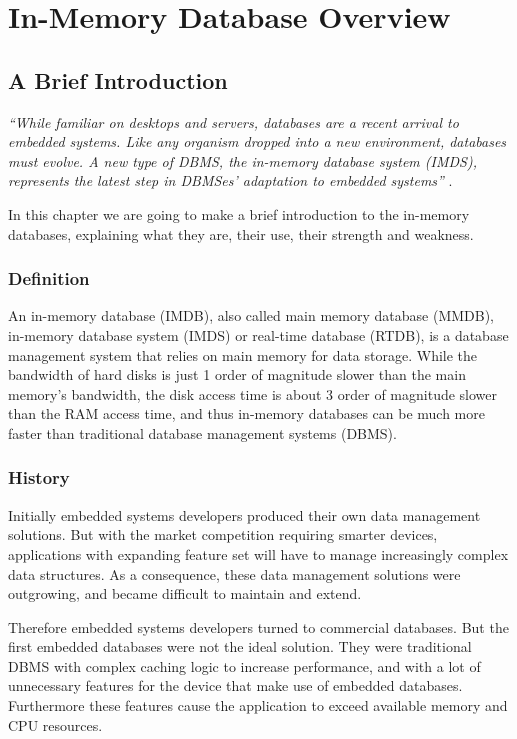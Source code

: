 
\part{In-Memory Database Overview}

\chapter{A Brief Introduction}
	\emph{
		``While familiar on desktops and servers, databases are a recent arrival to embedded systems. 
		Like any organism dropped into a new environment, databases must evolve. 
		A new type of DBMS, the in-memory database system (IMDS), represents the latest 
		step in DBMSes' adaptation to embedded systems'' 
	}\cite{Graves}.
	
	In this chapter we are going to make a brief introduction to the in-memory databases, explaining what they are, their use, their strength and weakness.
	
	\section{Definition}
		An in-memory database (IMDB), also called main memory database (MMDB), 
		in-memory database system (IMDS) or real-time database (RTDB), 
		is a database management system	that relies on main memory for data storage. 
		While the bandwidth of hard disks is just 1 order of magnitude slower than the 
		main memory's bandwidth, the disk access time is about 3 order of magnitude 
		slower than the RAM access time, and thus in-memory databases can be much more faster 
		than traditional database management systems (DBMS).
		
	\section{History}
		Initially embedded systems developers produced their own data management solutions. 
		But with the market competition requiring smarter devices, applications with 
		expanding feature set will have to manage increasingly complex data structures. 
		As a consequence, these data 
		management solutions were outgrowing, and became difficult to maintain and extend. 
		
		Therefore embedded systems developers turned to commercial databases. But the first 
		embedded databases were not the ideal solution. They were traditional DBMS with
		complex caching logic to increase performance, and with a lot of unnecessary features 
		for the device that make use of embedded databases. Furthermore these features cause 
		the application to exceed available memory and CPU resources.
		
